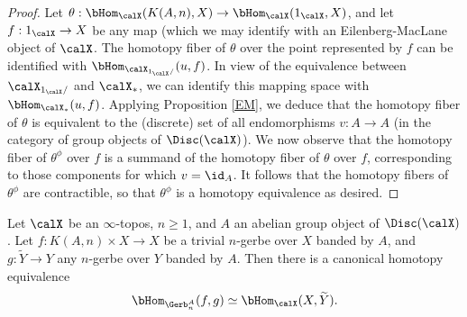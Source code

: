 \begin{proof}
Let $\theta: \bHom_{\calX}( K(A,n), X) \rightarrow \bHom_{\calX}(1_{\calX}, X)$, and let
$f: 1_{\calX} \rightarrow X$ be any map (which we may identify with an Eilenberg-MacLane object of $\calX$. The homotopy fiber of $\theta$ over the point represented by $f$ can be identified
with $\bHom_{\calX_{1_{\calX}/}}( u, f)$. In view of the equivalence between 
$\calX_{1_{\calX}/}$ and $\calX_{\ast}$, we can identify this mapping space with
$\bHom_{\calX_{\ast}}( u, f)$. Applying Proposition \ref{EM}, we deduce that
the homotopy fiber of $\theta$ is equivalent to the (discrete) set of all endomorphisms $v: A \rightarrow A$ (in the category of group objects of $\Disc( \calX)$). We now observe that
the homotopy fiber of $\theta^{\phi}$ over $f$ is a summand of the homotopy fiber of $\theta$ over $f$, corresponding to those components for which $v = \id_{A}$. It follows that the homotopy fibers
of $\theta^{\phi}$ are contractible, so that $\theta^{\phi}$ is a homotopy equivalence as desired.
\end{proof}

\begin{lemma}\label{starsky}
Let $\calX$ be an $\infty$-topos, $n \geq 1$, and $A$ an abelian group object of 
$\Disc( \calX)$. Let $f: K(A,n) \times X \rightarrow X$ be a trivial $n$-gerbe over
$X$ banded by $A$, and $g: \widetilde{Y} \rightarrow Y$ any $n$-gerbe over $Y$ banded by $A$.
Then there is a canonical homotopy equivalence
$$ \bHom_{ \Gerb^A_{n} }(f,g) \simeq \bHom_{ \calX } (X, \widetilde{Y} ).$$
\end{lemma}

